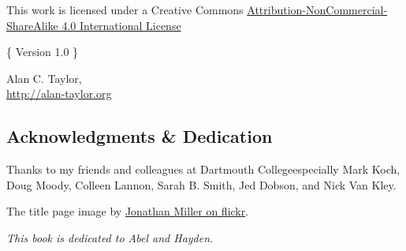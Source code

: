 

\vspace*{4cm}
\begin{center}


\ccbyncsa 

\vspace{1cm}

This work is licensed under a Creative Commons \href{https://creativecommons.org/licenses/by-nc-sa/4.0/}{Attribution-NonCommercial-ShareAlike 4.0 International License}

\vspace{3cm}



\noindent \{ Version 1.0 \}



\end{center}


\begin{center}


\vfill

Alan C. Taylor, \the\year \\


\href{http://www.alan-taylor.org}{http://alan-taylor.org}
\end{center}




\newpage

\begin{center}\section*{Acknowledgments \& Dedication}\end{center}

\bigskip

\noindent Thanks to my friends and colleagues at Dartmouth College\textemdash especially Mark Koch, Doug Moody, Colleen Lannon, Sarah B. Smith, Jed Dobson, and Nick Van Kley.

\vspace{1cm}

\begin{center}
\noindent The title page image by \href{https://www.flickr.com/photos/jonathanfmiller/7142111563/}{Jonathan Miller on flickr}.
\end{center}

\vspace{3cm}


\vfill

\begin{center}\emph{This book is dedicated to Abel and Hayden.}\end{center}

\newpage